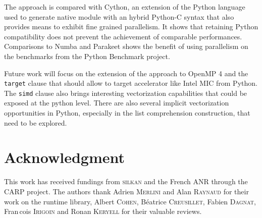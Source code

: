 \documentclass[conference]{IEEEtran}
\begin{document}
The approach is compared with Cython, an extension of the Python language used
to generate native module with an hybrid Python-C syntax that also provides
means to exhibit fine grained parallelism. It shows that retaining Python
compatibility does not prevent the achievement of comparable performances.
Comparisons to Numba and Parakeet shows the benefit of using parallelism on the
benchmarks from the Python Benchmark project.

Future work will focus on the extension of the approach to OpenMP 4 and the
\texttt{target} clause that should allow to target accelerator like Intel MIC
from Python.
The \texttt{simd} clause also brings interesting vectorization capabilities that
could be exposed at the python level. There are also several implicit
vectorization opportunities in Python, especially in the list comprehension
construction, that need to be explored.

\section*{Acknowledgment}

This work has received fundings from \textsc{silkan} and the French ANR through
the CARP project. The authors thank Adrien \textsc{Merlini} and Alan
\textsc{Raynaud} for their work on the runtime library, Albert \textsc{Cohen},
B{\'e}atrice \textsc{Creusillet}, Fabien \textsc{Dagnat}, Fran{\,c}ois
\textsc{Irigoin} and Ronan \textsc{Keryell} for their valuable reviews.







\end{document}
